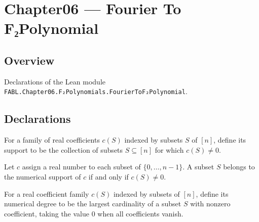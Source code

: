 \chapter{Chapter06 — Fourier To F₂Polynomial}
\section{Overview}

Declarations of the Lean module \texttt{FABL.Chapter06.F₂Polynomials.FourierToF₂Polynomial}.

\section{Declarations}

\begin{definition}
\label{FABL.numericalSupport}
\leanok
{}
For a family of real coefficients $c(S)$ indexed by subsets $S$ of $[n]$, define its
support to be the collection of subsets $S\subseteq[n]$ for which $c(S)\ne0$.
\end{definition}

\begin{theorem}
\label{FABL.mem_numericalSupport}
\leanok
{}
Let $c$ assign a real number to each subset of $\{0,\ldots,n-1\}$. A subset $S$ belongs
to the numerical support of $c$ if and only if $c(S)\ne 0$.
\end{theorem}

\begin{definition}
\label{FABL.numericalDegree}
\leanok
{}
For a real coefficient family $c(S)$ indexed by subsets of $[n]$, define its numerical
degree to be the largest cardinality of a subset $S$ with nonzero coefficient, taking
the value $0$ when all coefficients vanish.
\end{definition}

